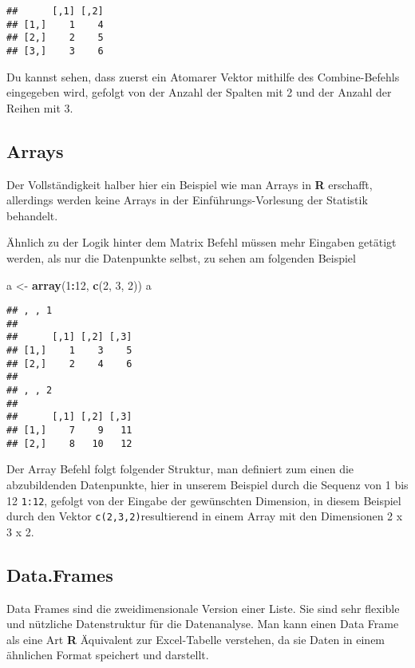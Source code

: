 \documentclass[
]{book}
\newenvironment{Shaded}{\begin{snugshade}}{\end{snugshade}}
\newcommand{\DecValTok}[1]{\textcolor[rgb]{0.00,0.00,0.81}{#1}}
\newcommand{\KeywordTok}[1]{\textcolor[rgb]{0.13,0.29,0.53}{\textbf{#1}}}
\newcommand{\NormalTok}[1]{#1}
\newcommand{\OperatorTok}[1]{\textcolor[rgb]{0.81,0.36,0.00}{\textbf{#1}}}
\newcommand{\StringTok}[1]{\textcolor[rgb]{0.31,0.60,0.02}{#1}}
\begin{document}
\begin{verbatim}
##      [,1] [,2]
## [1,]    1    4
## [2,]    2    5
## [3,]    3    6
\end{verbatim}

Du kannst sehen, dass zuerst ein Atomarer Vektor mithilfe des Combine-Befehls eingegeben wird, gefolgt von der Anzahl der Spalten mit 2 und der Anzahl der Reihen mit 3.

\hypertarget{arrays}{%
\subsection{Arrays}\label{arrays}}

Der Vollständigkeit halber hier ein Beispiel wie man Arrays in \textbf{R} erschafft, allerdings werden keine Arrays in der Einführungs-Vorlesung der Statistik behandelt.

Ähnlich zu der Logik hinter dem Matrix Befehl müssen mehr Eingaben getätigt werden, als nur die Datenpunkte selbst, zu sehen am folgenden Beispiel

\begin{Shaded}
\begin{Highlighting}[]
\NormalTok{a <-}\StringTok{ }\KeywordTok{array}\NormalTok{(}\DecValTok{1}\OperatorTok{:}\DecValTok{12}\NormalTok{, }\KeywordTok{c}\NormalTok{(}\DecValTok{2}\NormalTok{, }\DecValTok{3}\NormalTok{, }\DecValTok{2}\NormalTok{))}
\NormalTok{a}
\end{Highlighting}
\end{Shaded}

\begin{verbatim}
## , , 1
## 
##      [,1] [,2] [,3]
## [1,]    1    3    5
## [2,]    2    4    6
## 
## , , 2
## 
##      [,1] [,2] [,3]
## [1,]    7    9   11
## [2,]    8   10   12
\end{verbatim}

Der Array Befehl folgt folgender Struktur, man definiert zum einen die abzubildenden Datenpunkte, hier in unserem Beispiel durch die Sequenz von 1 bis 12 \texttt{1:12}, gefolgt von der Eingabe der gewünschten Dimension, in diesem Beispiel durch den Vektor \texttt{c(2,3,2)}resultierend in einem Array mit den Dimensionen 2 x 3 x 2.

\hypertarget{data.frames}{%
\subsection{Data.Frames}\label{data.frames}}

Data Frames sind die zweidimensionale Version einer Liste. Sie sind sehr flexible und nützliche Datenstruktur für die Datenanalyse.
Man kann einen Data Frame als eine Art \textbf{R} Äquivalent zur Excel-Tabelle verstehen, da sie Daten in einem ähnlichen Format speichert und darstellt.
\end{document}
